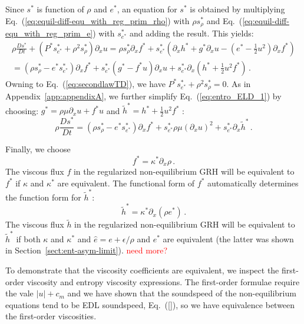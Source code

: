 \documentclass[review]{elsarticle}
\newcommand{\eqt}[1]{Eq.~(\ref{#1})}                     %
\newcommand{\sect}[1]{Section~\ref{#1}}                     %
\newcommand{\app}[1]{Appendix~\ref{#1}}                     %
\newcommand{\tcr}[1]{\textcolor{red}{#1}}
\newcommand{\matder}[1]{\frac{D #1}{Dt}}
\begin{document}
\begin{appendices}
Since $s^*$ is function of $\rho$ and $e^*$, an equation for $s^*$  is obtained by multiplying 
\eqt{eq:equil-diff-equ_with_reg_prim_rho} with $\rho s^*_\rho$  and 
\eqt{eq:equil-diff-equ_with_reg_prim_e}   with $s^*_{e^*}$ and adding the result. This yields:
\begin{multline} \label{eq:entro_ELD_1}
\rho \matder {s^*}  +  \left( P^* s^*_{e^*} + \rho^2 s^*_{\rho} \right) \partial_x u  = 
 \rho s^*_\rho \partial_x f^*
+ s^*_{e^*} \left(  \partial_x h^* + g^* \partial_x u - \left( e^* - \tfrac 1 2 u^2 \right) \partial_x  f^* \right) 
\\
=
\left( \rho s^*_\rho  - e^* s^*_{e^*}\right) \partial_x f^*
+ s^*_{e^*} \left(  g^* - f^* u \right) \partial_x u 
+ s^*_{e^*} \partial_x \left( h^* +  \tfrac 1 2 u^2  f^* \right) 
\, . 
\end{multline}
Owning to \eqt{eq:secondlawTD},  we have $ P^* s^*_{e^*} + \rho^2 s^*_{\rho}  = 0$. As in \app{app:appendixA}, we further 
simplify \eqt{eq:entro_ELD_1} by choosing: $ g^* = \rho \mu \partial_x u + f^* u$ and $\tilde h^* = h^* + \tfrac 1 2 u^2 f^*$ :
\begin{equation} \label{eq:entro_ELD_2}
\rho \matder {s^*}  
=
\left( \rho s^*_\rho  - e^* s^*_{e^*}\right) \partial_x f^*
+ s^*_{e^*} \rho \mu \left( \partial_x u \right)^2
+ s^*_{e^*} \partial_x \tilde h^* 
\, . 
\end{equation}

Finally, we choose 
\begin{equation} 
f^* = \kappa^* \partial_x \rho \, .
\end{equation}
The viscous flux $f$ in the regularized non-equilibrium GRH will be equivalent to $f^*$ if $\kappa$ and $\kappa^*$ are equivalent.
The functional form of $f^*$ automatically determines the function form for $\tilde h^*$:
\begin{equation} 
\tilde h^* = \kappa^* \partial_x (\rho e^*) \, .
\end{equation}
The viscous flux $\tilde h$ in the regularized non-equilibrium GRH will be equivalent to $\tilde h^*$ if both $\kappa$ and $\kappa^*$ and $\hat e = e+\epsilon/\rho$ and $e^*$ are equivalent (the latter was shown in \sect{sect:ent-asym-limit}). \tcr{need more?}

To demonstrate that the viscosity coefficients are equivalent, we inspect the first-order viscosity and entropy viscosity expressions. The first-order formulae require the vale $|u| + c_m$ and we have shown that the soundspeed of the non-equilibrium equations tend to be EDL soundspeed, \eqt{}, so we have equivalence between the first-order viscosities.


\end{appendices}
\end{document}
